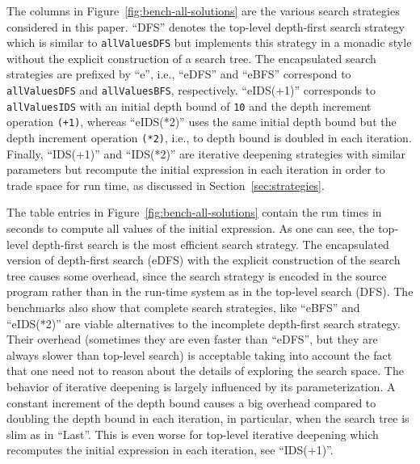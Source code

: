 \documentclass[english]{lni}
\newcommand{\code}[1]{\texttt{\small{}#1}}
\begin{document}
The columns in Figure~\ref{fig:bench-all-solutions}
are the various search strategies considered in this paper.
``DFS'' denotes the top-level depth-first search strategy
which is similar to \code{allValuesDFS} but implements
this strategy in a monadic style without the explicit
construction of a search tree.
The encapsulated search strategies are prefixed by ``e'',
i.e., ``eDFS'' and ``eBFS'' correspond to \code{allValuesDFS}
and \code{allValuesBFS}, respectively.
``eIDS(+1)'' corresponds to \code{allValuesIDS}
with an initial depth bound of \code{10} and the depth increment
operation \code{(+1)}, whereas ``eIDS(*2)'' uses the same initial depth bound
but the depth increment operation \code{(*2)}, i.e., to depth bound
is doubled in each iteration.
Finally, ``IDS(+1)'' and ``IDS(*2)'' are iterative deepening
strategies with similar parameters but recompute the initial
expression in each iteration in order to trade space for run time,
as discussed in Section~\ref{sec:strategies}.

The table entries in Figure~\ref{fig:bench-all-solutions}
contain the run times in seconds to compute all values of the initial
expression.
As one can see, the top-level depth-first search is the most efficient
search strategy.
The encapsulated version of depth-first search (eDFS)
with the explicit construction of the search tree
causes some overhead, since the search strategy
is encoded in the source program rather than in the run-time system
as in the top-level search (DFS).
The benchmarks also show that
complete search strategies, like ``eBFS'' and ``eIDS(*2)''
are viable alternatives to the incomplete depth-first search strategy.
Their overhead (sometimes they are even faster than ``eDFS'',
but they are always slower than top-level search)
is acceptable taking into account the fact
that one need not to reason about the details of exploring the
search space. The behavior of iterative deepening is largely
influenced by its parameterization.
A constant increment of the depth bound causes a big overhead
compared to doubling the depth bound in each iteration,
in particular, when the search tree is slim as in ``Last''.
This is even worse for top-level iterative deepening
which recomputes the initial expression in each iteration,
see ``IDS(+1)''.
\end{document}
